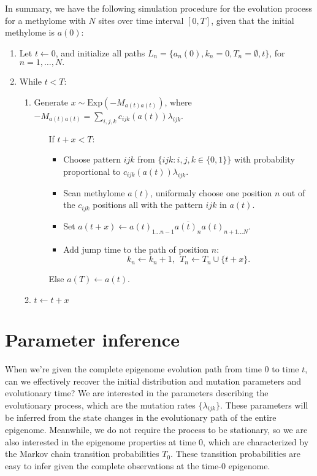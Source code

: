 \documentclass[11pt]{article}
\begin{document}
In summary, we have the following simulation procedure for the evolution
process for a methylome with $N$ sites over time interval $[0, T]$, given
that the initial methylome is $a(0)$:
\begin{enumerate}
\item Let $t \leftarrow 0$, and initialize all paths $L_n = \{a_n(0),
  k_n=0, T_n=\emptyset, t\}$, for $n=1,\ldots, N.$
\item While $t < T$:
  \begin{enumerate}
  \item Generate $x\sim \text{Exp}(-M_{a(t)a(t)})$, where
    $-M_{a(t)a(t)} = \sum\limits_{i,j,k}c_{ijk}(a(t))\lambda_{ijk}$.
    \begin{itemize}
    \item[If] $t+x < T$:
      \begin{itemize}
      \item Choose pattern $ijk$ from $\{ijk: i,j,k\in\{0,1\}\}$ with
        probability proportional to $c_{ijk}(a(t))\lambda_{ijk}$.
      \item Scan methylome $a(t)$, uniformaly choose one position $n$
        out of the $c_{ijk}$ positions all with the pattern $ijk$ in $a(t)$.
      \item Set $a(t+x) \leftarrow a(t)_{1\ldots n-1} \overline{a(t)_n}
        a(t)_{n+1 \ldots N}$.
      \item Add jump time to the path of position $n$:
        $$k_n \leftarrow k_n +1, ~~ T_n \leftarrow T_n\cup \{t+x\}.$$
      \end{itemize}
    \item[Else] $a(T) \leftarrow a(t)$.
    \end{itemize}
  \item $t \leftarrow t+x$
  \end{enumerate}
\end{enumerate}

\section{Parameter inference}

When we're given the complete epigenome evolution path from time $0$
to time $t$, can we effectively recover the initial distribution and
mutation parameters and evolutionary time? We are interested in the
parameters describing the evolutionary process, which are the mutation
rates $\{\lambda_{ijk}\}$. These parameters will be inferred from the
state changes in the evolutionary path of the entire
epigenome. Meanwhile, we do not require the process to be stationary,
so we are also interested in the epigenome properties at time 0, which
are characterized by the Markov chain transition probabilities
$T_{0}$. These transition probabilities are easy to infer given the
complete observations at the time-0 epigenome.
\end{document}
